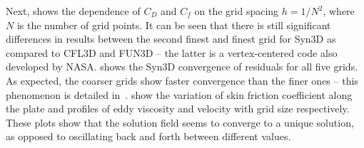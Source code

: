 Next,  shows the dependence of $C_D$ and $C_f$ on the grid spacing $h = 1/N^2$, where $N$ is the number of grid points. It can be seen that there is still significant differences in results between the second finest and finest grid for Syn3D as compared to CFL3D and FUN3D -- the latter is a vertex-centered code also developed by NASA.  shows the Syn3D convergence of residuals for all five grids. As expected, the coarser grids show faster convergence than the finer ones -- this phenomenon is detailed in~\cite{blazek2015computational}.  show the variation of skin friction coefficient along the plate and profiles of eddy viscosity and velocity with grid size respectively. These plots show that the solution field seems to converge to a unique solution, as opposed to oscillating back and forth between different values.
